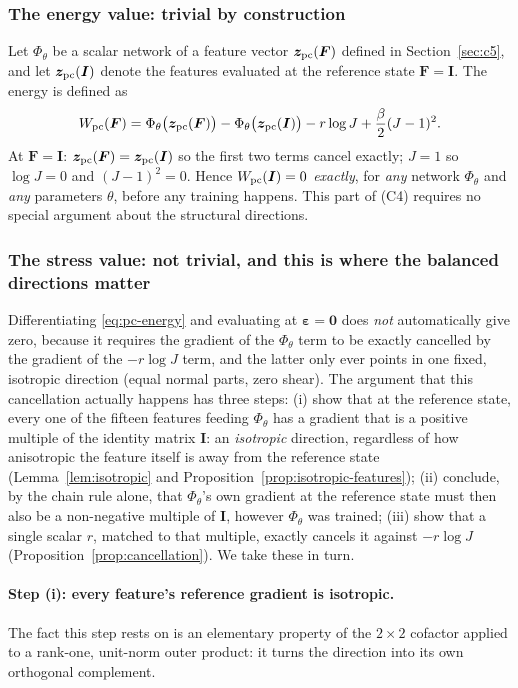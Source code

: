 \documentclass[10pt,a4paper]{article}
\begin{document}
\subsubsection{The energy value: trivial by construction}
Let $\Phi_\theta$ be a scalar network of a feature vector $\bm
z_{\rm pc}(\bm F)$ defined in Section~\ref{sec:c5}, and let $\bm
z_{\rm pc}(\bm I)$ denote the features evaluated at the reference state
$\bm F=\bm I$.  The energy is defined as
\begin{equation}
 W_{\rm pc}(\bm F)=\Phi_\theta\big(\bm z_{\rm pc}(\bm F)\big)
 -\Phi_\theta\big(\bm z_{\rm pc}(\bm I)\big)-r\log J+\frac\beta2(J-1)^2 .
 \label{eq:pc-energy}
\end{equation}
At $\bm F=\bm I$: $\bm z_{\rm pc}(\bm F)=\bm z_{\rm pc}(\bm I)$ so the first two terms
cancel exactly; $J=1$ so $\log J=0$ and $(J-1)^2=0$.  Hence
$W_{\rm pc}(\bm I)=0$ \emph{exactly}, for \emph{any} network $\Phi_\theta$ and
\emph{any} parameters $\theta$, before any training happens.  This part
of (C4) requires no special argument about the structural directions.

\subsubsection{The stress value: not trivial, and this is where the balanced directions matter}
Differentiating \eqref{eq:pc-energy} and evaluating at $\bm\varepsilon=\bm0$
does \emph{not} automatically give zero, because it requires the gradient of
the $\Phi_\theta$ term to be exactly cancelled by the gradient of the
$-r\log J$ term, and the latter only ever points in one fixed,
isotropic direction (equal normal parts, zero shear). The argument that
this cancellation actually happens has three steps: (i) show that at
the reference state, every one of the fifteen features feeding
$\Phi_\theta$ has a gradient that is a positive multiple of the
identity matrix $\bm I$: an \emph{isotropic} direction, regardless of how
anisotropic the feature itself is away from the reference state
(Lemma~\ref{lem:isotropic} and Proposition~\ref{prop:isotropic-features});
(ii) conclude, by the chain rule alone, that $\Phi_\theta$'s own
gradient at the reference state must then also be a non-negative
multiple of $\bm I$, however $\Phi_\theta$ was trained; (iii) show that a
single scalar $r$, matched to that multiple, exactly cancels it
against $-r\log J$ (Proposition~\ref{prop:cancellation}). We take these
in turn.

\paragraph{Step (i): every feature's reference gradient is isotropic.}
The fact this step rests on is an elementary property of the
$2\times2$ cofactor applied to a rank-one, unit-norm outer product: it
turns the direction into its own orthogonal complement.
\end{document}
